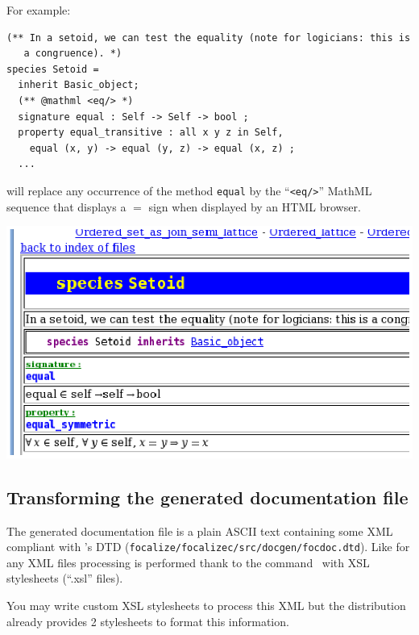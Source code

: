 For example:
{\scriptsize
\begin{lstlisting}
(** In a setoid, we can test the equality (note for logicians: this is
   a congruence). *)
species Setoid =
  inherit Basic_object;
  (** @mathml <eq/> *)
  signature equal : Self -> Self -> bool ;
  property equal_transitive : all x y z in Self,
    equal (x, y) -> equal (y, z) -> equal (x, z) ;
  ...
\end{lstlisting}
}
will replace any occurrence of the method {\tt equal} by the
``\verb+<eq/>+'' MathML sequence that displays a $=$ sign when
displayed by an HTML browser.

\medskip
\includegraphics{mathml_snapshot.ps}



\subsection{Transforming the generated documentation file}
The generated documentation file is a plain ASCII text containing some
XML compliant with \focal's DTD
({\tt focalize/focalizec/src/docgen/focdoc.dtd}). Like for any XML
files processing is performed thank to the command \xsltproc\ with
XSL stylesheets (``.xsl'' files).

You may write custom XSL stylesheets to process this XML but the
distribution already provides 2 stylesheets to format this
information.



